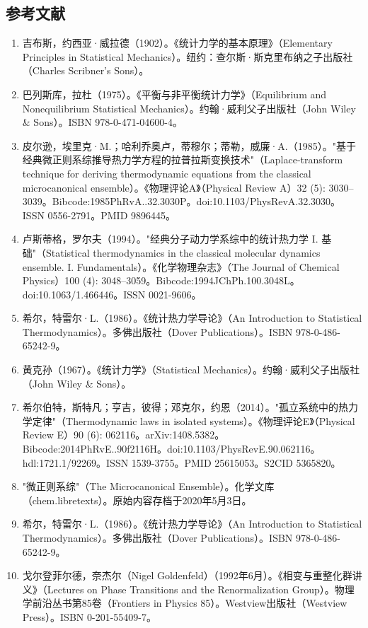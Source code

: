 \subsection{参考文献}  
\begin{enumerate}
\item 吉布斯，约西亚·威拉德（1902）。《统计力学的基本原理》（Elementary Principles in Statistical Mechanics）。纽约：查尔斯·斯克里布纳之子出版社（Charles Scribner's Sons）。  
\item 巴列斯库，拉杜（1975）。《平衡与非平衡统计力学》（Equilibrium and Nonequilibrium Statistical Mechanics）。约翰·威利父子出版社（John Wiley & Sons）。ISBN 978-0-471-04600-4。  
\item 皮尔逊，埃里克·M.；哈利乔奥卢，蒂穆尔；蒂勒，威廉·A.（1985）。"基于经典微正则系综推导热力学方程的拉普拉斯变换技术"（Laplace-transform technique for deriving thermodynamic equations from the classical microcanonical ensemble）。《物理评论A》（Physical Review A）32 (5): 3030–3039。Bibcode:1985PhRvA..32.3030P。doi:10.1103/PhysRevA.32.3030。ISSN 0556-2791。PMID 9896445。  
\item 卢斯蒂格，罗尔夫（1994）。"经典分子动力学系综中的统计热力学 I. 基础"（Statistical thermodynamics in the classical molecular dynamics ensemble. I. Fundamentals）。《化学物理杂志》（The Journal of Chemical Physics）100 (4): 3048–3059。Bibcode:1994JChPh.100.3048L。doi:10.1063/1.466446。ISSN 0021-9606。  
\item 希尔，特雷尔·L.（1986）。《统计热力学导论》（An Introduction to Statistical Thermodynamics）。多佛出版社（Dover Publications）。ISBN 978-0-486-65242-9。  
\item 黄克孙（1967）。《统计力学》（Statistical Mechanics）。约翰·威利父子出版社（John Wiley & Sons）。  
\item 希尔伯特，斯特凡；亨吉，彼得；邓克尔，约恩（2014）。"孤立系统中的热力学定律"（Thermodynamic laws in isolated systems）。《物理评论E》（Physical Review E）90 (6): 062116。arXiv:1408.5382。Bibcode:2014PhRvE..90f2116H。doi:10.1103/PhysRevE.90.062116。hdl:1721.1/92269。ISSN 1539-3755。PMID 25615053。S2CID 5365820。  
\item "微正则系综"（The Microcanonical Ensemble）。化学文库（chem.libretexts）。原始内容存档于2020年5月3日。  
\item 希尔，特雷尔·L.（1986）。《统计热力学导论》（An Introduction to Statistical Thermodynamics）。多佛出版社（Dover Publications）。ISBN 978-0-486-65242-9。  
\item 戈尔登菲尔德，奈杰尔（Nigel Goldenfeld）（1992年6月）。《相变与重整化群讲义》（Lectures on Phase Transitions and the Renormalization Group）。物理学前沿丛书第85卷（Frontiers in Physics 85）。Westview出版社（Westview Press）。ISBN 0-201-55409-7。  

\end{enumerate}
